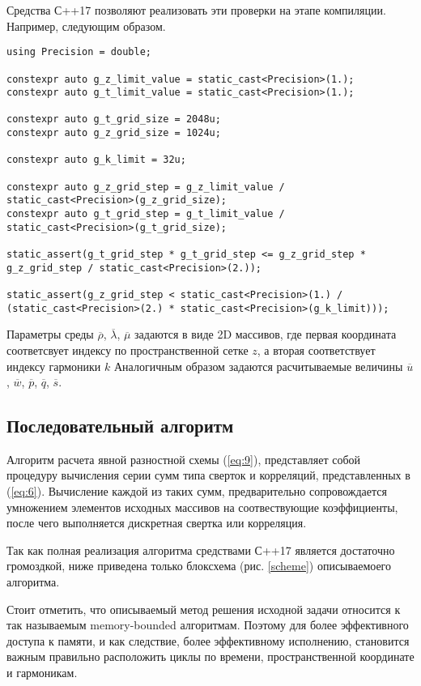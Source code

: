 Средства С++17 позволяют реализовать эти проверки на этапе компиляции. Например, следующим образом.

\begin{lstlisting}[style={CppCodeStyle}]
using Precision = double;

constexpr auto g_z_limit_value = static_cast<Precision>(1.);
constexpr auto g_t_limit_value = static_cast<Precision>(1.);

constexpr auto g_t_grid_size = 2048u;
constexpr auto g_z_grid_size = 1024u;

constexpr auto g_k_limit = 32u;

constexpr auto g_z_grid_step = g_z_limit_value / static_cast<Precision>(g_z_grid_size);
constexpr auto g_t_grid_step = g_t_limit_value / static_cast<Precision>(g_t_grid_size);

static_assert(g_t_grid_step * g_t_grid_step <= g_z_grid_step * g_z_grid_step / static_cast<Precision>(2.));

static_assert(g_z_grid_step < static_cast<Precision>(1.) / (static_cast<Precision>(2.) * static_cast<Precision>(g_k_limit)));
\end{lstlisting}

Параметры среды $\overline\rho$, $\overline\lambda$, $\overline\mu$ задаются в виде 2D массивов, 
где первая координата соответсвует индексу по пространственной сетке $z$, а вторая соответствует индексу гармоники $k$
Аналогичным образом задаются расчитываемые величины $\overline u$, $\overline w$, $\overline p$, $\overline q$, $\overline s$.

\subsection{Последовательный алгоритм}

Алгоритм расчета явной разностной схемы (\ref{eq:9}), представляет собой процедуру вычисления серии сумм типа сверток и корреляций,
представленных в (\ref{eq:6}). Вычисление каждой из таких сумм, предварительно сопровождается умножением элементов исходных 
массивов на соотвествующие коэффициенты, после чего выполняется дискретная свертка или корреляция.

Так как полная реализация алгоритма средствами С++17 является достаточно громоздкой, ниже приведена только блоксхема (рис. \ref{scheme}) описываемоего алгоритма.


Стоит отметить, что описываемый метод решения исходной задачи относится к так называемым memory-bounded алгоритмам.
Поэтому для более эффективного доступа к памяти, и как следствие, более эффективному исполнению,
становится важным правильно расположить циклы по времени, пространственной координате и гармоникам.


